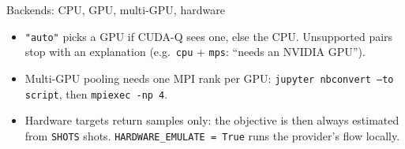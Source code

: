 \documentclass[aspectratio=169,11pt]{beamer}
\begin{document}
\begin{frame}{Backends: CPU, GPU, multi-GPU, hardware}
  \footnotesize
  \begin{center}
  \end{center}
  \begin{itemize}
    \item \texttt{"auto"} picks a GPU if CUDA-Q sees one, else the CPU. Unsupported pairs stop with an explanation
      (e.g.\ \texttt{cpu} + \texttt{mps}: ``needs an NVIDIA GPU'').
    \item Multi-GPU pooling needs one MPI rank per GPU: \texttt{jupyter nbconvert --to script}, then \texttt{mpiexec -np 4}.
    \item Hardware targets return samples only: the objective is then always estimated from \texttt{SHOTS} shots.
      \texttt{HARDWARE\_EMULATE = True} runs the provider's flow locally.
  \end{itemize}
\end{frame}
\end{document}

